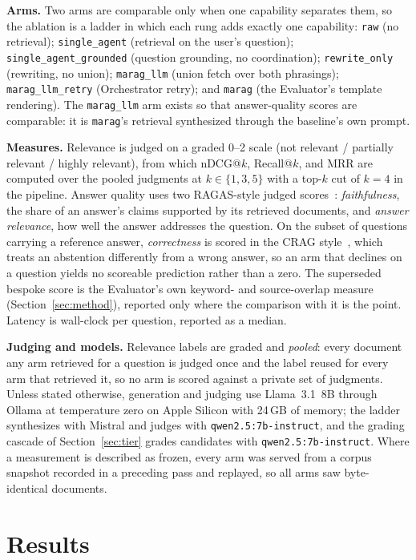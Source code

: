 \documentclass[10pt,conference]{IEEEtran}
\begin{document}
\textbf{Arms.} Two arms are comparable only when one capability separates them,
so the ablation is a ladder in which each rung adds exactly one capability:
\texttt{raw} (no retrieval); \texttt{single\_agent} (retrieval on the user's
question); \texttt{single\_agent\_grounded} (question grounding, no coordination);
\texttt{rewrite\_only} (rewriting, no union); \texttt{marag\_llm} (union fetch
over both phrasings); \texttt{marag\_llm\_retry} (Orchestrator retry); and
\texttt{marag} (the Evaluator's template rendering). The \texttt{marag\_llm} arm
exists so that answer-quality scores are comparable: it is \texttt{marag}'s
retrieval synthesized through the baseline's own prompt.

\textbf{Measures.} Relevance is judged on a graded 0--2 scale (not relevant /
partially relevant / highly relevant), from which nDCG@$k$, Recall@$k$, and MRR
are computed over the pooled judgments at $k \in \{1,3,5\}$ with a top-$k$ cut of
$k=4$ in the pipeline. Answer quality uses two RAGAS-style judged
scores~\cite{es2024ragas}: \emph{faithfulness}, the share of an answer's claims
supported by its retrieved documents, and \emph{answer relevance}, how well the
answer addresses the question. On the subset of questions carrying a reference
answer, \emph{correctness} is scored in the CRAG style~\cite{yang2024}, which
treats an abstention differently from a wrong answer, so an arm that declines on a
question yields no scoreable prediction rather than a zero. The superseded bespoke
score is the Evaluator's own keyword- and source-overlap measure
(Section~\ref{sec:method}), reported only where the comparison with it is the
point. Latency is wall-clock per question, reported as a median.

\textbf{Judging and models.} Relevance labels are graded and \emph{pooled}: every
document any arm retrieved for a question is judged once and the label reused for
every arm that retrieved it, so no arm is scored against a private set of
judgments. Unless stated otherwise, generation and judging use Llama~3.1~8B
through Ollama at temperature zero on Apple Silicon with 24\,GB of memory; the
ladder synthesizes with Mistral and judges with \texttt{qwen2.5:7b-instruct}, and
the grading cascade of Section~\ref{sec:tier} grades candidates with
\texttt{qwen2.5:7b-instruct}. Where a measurement is described as frozen, every
arm was served from a corpus snapshot recorded in a preceding pass and replayed,
so all arms saw byte-identical documents.

\section{Results}\label{sec:results}
\end{document}
